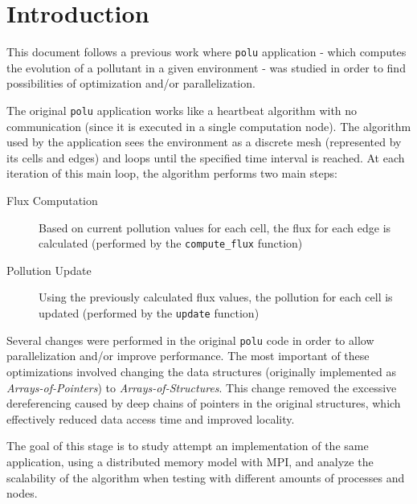 \section{Introduction}
\label{sec:intro}

This document follows a previous work where \texttt{polu} application - which computes the evolution of a pollutant in a given environment - was studied in order to find possibilities of optimization and/or parallelization.

The original \texttt{polu} application works like a heartbeat algorithm with no communication (since it is executed in a single computation node). The algorithm used by the application sees the environment as a discrete mesh (represented by its cells and edges) and loops until the specified time interval is reached. At each iteration of this main loop, the algorithm performs two main steps:

\begin{description}
	\item[Flux Computation] Based on current pollution values for each cell, the flux for each edge is calculated (performed by the \texttt{compute\_flux} function)
	\item[Pollution Update] Using the previously calculated flux values, the pollution for each cell is updated (performed by the \texttt{update} function)
\end{description}

Several changes were performed in the original \texttt{polu} code in order to allow parallelization and/or improve performance. The most important of these optimizations involved changing the data structures (originally implemented as \textit{Arrays-of-Pointers}) to \textit{Arrays-of-Structures}. This change removed the excessive dereferencing caused by deep chains of pointers in the original structures, which effectively reduced data access time and improved locality.

The goal of this stage is to study attempt an implementation of the same application, using a distributed memory model with MPI, and analyze the scalability of the algorithm when testing with different amounts of processes and nodes.


